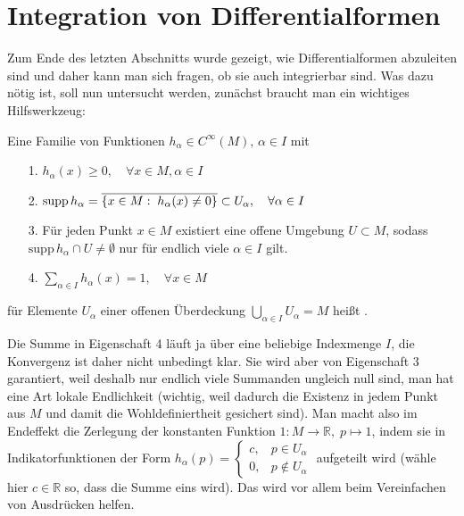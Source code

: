 \documentclass[../H_Analysis_main.tex]{subfiles}
\begin{document}
	\section{Integration von Differentialformen}
Zum Ende des letzten Abschnitts wurde gezeigt, wie Differentialformen abzuleiten sind und daher kann man sich fragen, ob sie auch integrierbar sind. Was dazu nötig ist, soll nun untersucht werden, zunächst braucht man ein wichtiges Hilfswerkzeug:
\begin{defi}
Eine Familie von Funktionen $h_\alpha \in C^\infty(M), \, \alpha \in I$ mit
\begin{itemize}
\item[1.] $h_\alpha(x) \geq 0, \quad \forall x \in M, \alpha \in I$

\item[2.] $\text{supp} \, h_\alpha = \overline{\qty{x \in M: \; h_\alpha(x) \neq 0}} \subset U_\alpha, \quad \forall \alpha \in I$

\item[3.] Für jeden Punkt $x \in M$ existiert eine offene Umgebung $U \subset M$, sodass $\text{supp} \, h_\alpha \cap U \neq \emptyset$ nur für endlich viele $\alpha \in I$ gilt.

\item[4.] $\displaystyle \sum_{\alpha \in I} h_\alpha(x) = 1, \quad \forall x \in M$
\end{itemize}
für Elemente $U_\alpha$ einer offenen Überdeckung $\displaystyle \bigcup_{\alpha \in I} U_\alpha = M$ heißt .
\end{defi}
Die Summe in Eigenschaft 4 läuft ja über eine beliebige Indexmenge $I$, die Konvergenz ist daher nicht unbedingt klar. Sie wird aber von Eigenschaft 3 garantiert, weil deshalb nur endlich viele Summanden ungleich null sind, man hat eine Art lokale Endlichkeit (wichtig, weil dadurch die Existenz in jedem Punkt aus $M$ und damit die Wohldefiniertheit gesichert sind). Man macht also im Endeffekt die Zerlegung der konstanten Funktion $1: M \rightarrow \mathbb{R}, \; p \mapsto 1$, indem sie in Indikatorfunktionen der Form $h_\alpha(p) = \begin{cases} c, & p \in U_\alpha \\ 0, & p \notin U_\alpha \end{cases}$ aufgeteilt wird (wähle hier $c \in \mathbb{R}$ so, dass die Summe eins wird). Das wird vor allem beim Vereinfachen von Ausdrücken helfen.
\end{document}

